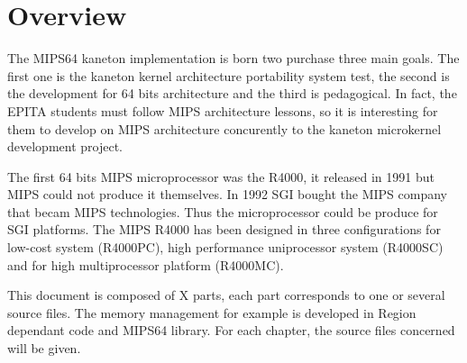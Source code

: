 %
%
%
%
%
%

%
%

\chapter{Overview}

The MIPS64 kaneton implementation is born two purchase three main goals.
The first one is the kaneton kernel architecture portability system test,
the second is the development for 64 bits architecture and the third is pedagogical.
In fact, the EPITA students must follow MIPS architecture lessons, so it is interesting 
for them to develop on MIPS architecture concurently to the kaneton microkernel development
project.

The first 64 bits MIPS microprocessor was the R4000, it released in 1991 but MIPS could not produce it themselves.
In 1992 SGI bought the MIPS company that becam MIPS technologies. Thus the microprocessor could be produce for SGI platforms. The MIPS R4000 has been designed in three configurations for low-cost system (R4000PC), high performance uniprocessor system (R4000SC) and for high multiprocessor platform (R4000MC).

This document is composed of X parts, each part corresponds to one or several source files. The memory management for example is developed in Region dependant code and MIPS64 library. For each chapter, the source files concerned will be given.
